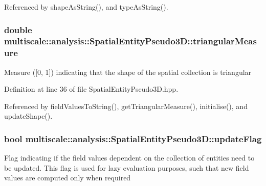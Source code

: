 \-Referenced by shape\-As\-String(), and type\-As\-String().

\hypertarget{classmultiscale_1_1analysis_1_1SpatialEntityPseudo3D_a7e8a7c888b5ab5a204f6d4ffa283709c}{
\subsubsection[{triangular\-Measure}]{\setlength{\rightskip}{0pt plus 5cm}double {\bf multiscale\-::analysis\-::\-Spatial\-Entity\-Pseudo3\-D\-::triangular\-Measure}}}\label{classmultiscale_1_1analysis_1_1SpatialEntityPseudo3D_a7e8a7c888b5ab5a204f6d4ffa283709c}
\-Measure (\mbox{[}0, 1\mbox{]}) indicating that the shape of the spatial collection is triangular 

\-Definition at line 36 of file \-Spatial\-Entity\-Pseudo3\-D.\-hpp.



\-Referenced by field\-Values\-To\-String(), get\-Triangular\-Measure(), initialise(), and update\-Shape().

\hypertarget{classmultiscale_1_1analysis_1_1SpatialEntityPseudo3D_a2fc7e2c00fcd725cb247b27c69726c8b}{
\subsubsection[{update\-Flag}]{\setlength{\rightskip}{0pt plus 5cm}bool {\bf multiscale\-::analysis\-::\-Spatial\-Entity\-Pseudo3\-D\-::update\-Flag}}}\label{classmultiscale_1_1analysis_1_1SpatialEntityPseudo3D_a2fc7e2c00fcd725cb247b27c69726c8b}
\-Flag indicating if the field values dependent on the collection of entities need to be updated. \-This flag is used for lazy evaluation purposes, such that new field values are computed only when required 

